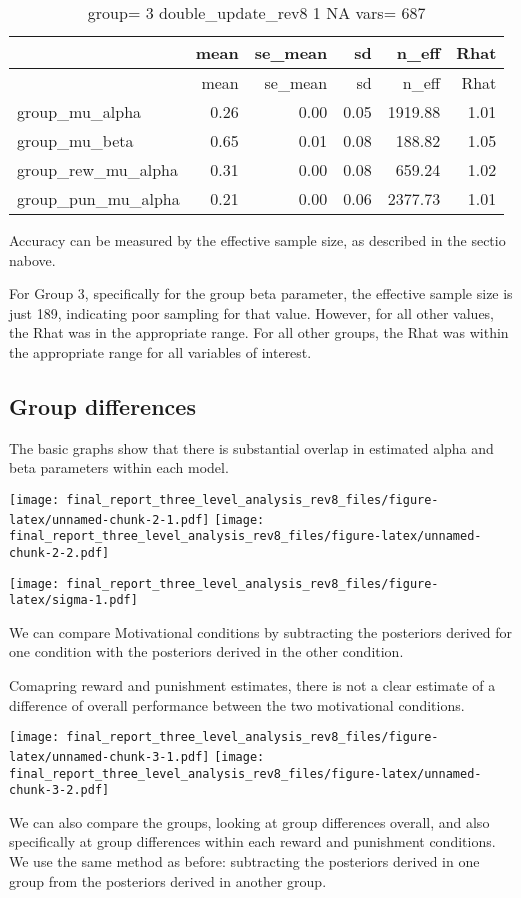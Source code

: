 \documentclass[]{article}
\begin{document}
\begin{longtable}[]{@{}lrrrrr@{}}
\caption{group= 3 double\_update\_rev8 1 NA vars= 687}\tabularnewline
\toprule
& mean & se\_mean & sd & n\_eff & Rhat\tabularnewline
\midrule
\endfirsthead
\toprule
& mean & se\_mean & sd & n\_eff & Rhat\tabularnewline
\midrule
\endhead
group\_mu\_alpha & 0.26 & 0.00 & 0.05 & 1919.88 & 1.01\tabularnewline
group\_mu\_beta & 0.65 & 0.01 & 0.08 & 188.82 & 1.05\tabularnewline
group\_rew\_mu\_alpha & 0.31 & 0.00 & 0.08 & 659.24 &
1.02\tabularnewline
group\_pun\_mu\_alpha & 0.21 & 0.00 & 0.06 & 2377.73 &
1.01\tabularnewline
\bottomrule
\end{longtable}

Accuracy can be measured by the effective sample size, as described in
the sectio nabove.

For Group 3, specifically for the group beta parameter, the effective
sample size is just 189, indicating poor sampling for that value.
However, for all other values, the Rhat was in the appropriate range.
For all other groups, the Rhat was within the appropriate range for all
variables of interest.

\subsection{Group differences}\label{group-differences}

The basic graphs show that there is substantial overlap in estimated
alpha and beta parameters within each model.

\texttt{[image: final\_report\_three\_level\_analysis\_rev8\_files/figure-latex/unnamed-chunk-2-1.pdf]}
\texttt{[image: final\_report\_three\_level\_analysis\_rev8\_files/figure-latex/unnamed-chunk-2-2.pdf]}

\texttt{[image: final\_report\_three\_level\_analysis\_rev8\_files/figure-latex/sigma-1.pdf]}

We can compare Motivational conditions by subtracting the posteriors
derived for one condition with the posteriors derived in the other
condition.

Comapring reward and punishment estimates, there is not a clear estimate
of a difference of overall performance between the two motivational
conditions.

\texttt{[image: final\_report\_three\_level\_analysis\_rev8\_files/figure-latex/unnamed-chunk-3-1.pdf]}
\texttt{[image: final\_report\_three\_level\_analysis\_rev8\_files/figure-latex/unnamed-chunk-3-2.pdf]}

We can also compare the groups, looking at group differences overall,
and also specifically at group differences within each reward and
punishment conditions. We use the same method as before: subtracting the
posteriors derived in one group from the posteriors derived in another
group.
\end{document}
